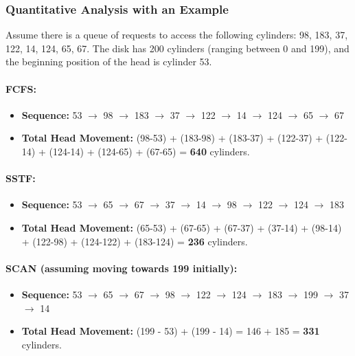 \documentclass[12pt]{article}
\begin{document}
\subsubsection{Quantitative Analysis with an Example}
Assume there is a queue of requests to access the following cylinders: 98, 183, 37, 122, 14, 124, 65, 67. The disk has 200 cylinders (ranging between 0 and 199), and the beginning position of the head is cylinder 53.

\paragraph{FCFS:}
\begin{itemize}
    \item \textbf{Sequence:} 53 \(\rightarrow\) 98 \(\rightarrow\) 183 \(\rightarrow\) 37 \(\rightarrow\) 122 \(\rightarrow\) 14 \(\rightarrow\) 124 \(\rightarrow\) 65 \(\rightarrow\) 67
    \item \textbf{Total Head Movement:} (98-53) + (183-98) + (183-37) + (122-37) + (122-14) + (124-14) + (124-65) + (67-65) = \textbf{640} cylinders.
\end{itemize}

\paragraph{SSTF:}
\begin{itemize}
    \item \textbf{Sequence:} 53 \(\rightarrow\) 65 \(\rightarrow\) 67 \(\rightarrow\) 37 \(\rightarrow\) 14 \(\rightarrow\) 98 \(\rightarrow\) 122 \(\rightarrow\) 124 \(\rightarrow\) 183
    \item \textbf{Total Head Movement:} (65-53) + (67-65) + (67-37) + (37-14) + (98-14) + (122-98) + (124-122) + (183-124) = \textbf{236} cylinders.
\end{itemize}

\paragraph{SCAN (assuming moving towards 199 initially):}
\begin{itemize}
    \item \textbf{Sequence:} 53 \(\rightarrow\) 65 \(\rightarrow\) 67 \(\rightarrow\) 98 \(\rightarrow\) 122 \(\rightarrow\) 124 \(\rightarrow\) 183 \(\rightarrow\) 199 \(\rightarrow\) 37 \(\rightarrow\) 14
    \item \textbf{Total Head Movement:} (199 - 53) + (199 - 14) = 146 + 185 = \textbf{331} cylinders.
\end{itemize}
\end{document}
